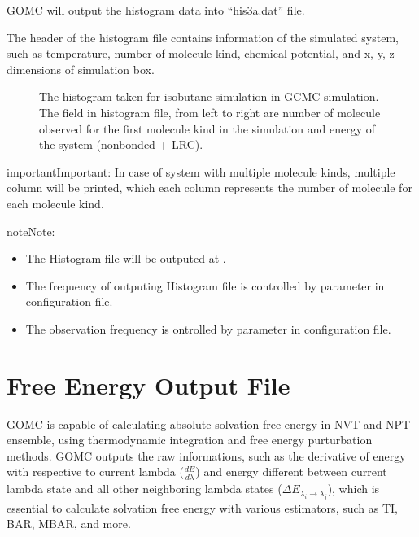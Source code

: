 \documentclass[letterpaper,10pt,english]{sphinxmanual}
\begin{document}
GOMC will output the histogram data into “his3a.dat” file.

The header of the histogram file contains information of the simulated system, such as temperature,
number of molecule kind, chemical potential, and x, y, z dimensions of simulation box.

\begin{figure}[htbp]
\centering
\capstart

\noindent{}
\caption{The histogram taken for isobutane simulation in GCMC simulation. The field in
histogram file, from left to right are number of molecule observed for the first molecule kind
in the simulation and energy of the system (nonbonded + LRC).}\label{\detokenize{output_file:id16}}\end{figure}

\begin{sphinxadmonition}{important}{Important:}
In case of system with multiple molecule kinds, multiple column will be printed, which each column
represents the number of molecule for each molecule kind.
\end{sphinxadmonition}

\begin{sphinxadmonition}{note}{Note:}\begin{itemize}
\item {} 
The Histogram file will be outputed at .

\item {} 
The frequency of outputing Histogram file is controlled by 
parameter in configuration file.

\item {} 
The observation frequency is ontrolled by  parameter in configuration file.

\end{itemize}
\end{sphinxadmonition}


\section{Free Energy Output File}
\label{\detokenize{output_file:free-energy-output-file}}
GOMC is capable of calculating absolute solvation free energy in NVT and NPT ensemble, using
thermodynamic integration and free energy purturbation methods.
GOMC outputs the raw informations, such as the derivative of energy with respective to current
lambda (\(\frac{dE}{d\lambda}\)) and energy different between current lambda state
and all other neighboring lambda states (\(\Delta E_{{\lambda}_i \rightarrow {\lambda}_j}\)),
which is essential to calculate solvation free energy with various estimators, such as TI, BAR, MBAR, and more.
\end{document}
